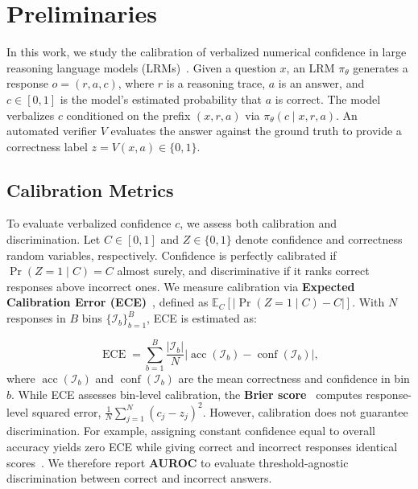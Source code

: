 \documentclass{article} %
\begin{document}
\section{Preliminaries}
In this work, we study the calibration of verbalized numerical confidence in large reasoning language models (LRMs)~\citep{xiong2024can,damani2026beyond}.
Given a question $x$, an LRM $\pi_\theta$ generates a response $o = (r, a, c)$, where $r$ is a reasoning trace, $a$ is an answer, and $c \in [0, 1]$ is the model's estimated probability that $a$ is correct.
The model verbalizes $c$ conditioned on the prefix $(x, r, a)$ via $\pi_\theta(c \mid x, r, a)$.
An automated verifier $V$ evaluates the answer against the ground truth to provide a correctness label $z = V(x, a) \in \{0, 1\}$.





\subsection{Calibration Metrics}

To evaluate verbalized confidence $c$, we assess both calibration and discrimination.
Let $C\in[0,1]$ and $Z\in\{0,1\}$ denote confidence and correctness random variables, respectively.
Confidence is perfectly calibrated if $\Pr(Z=1\mid C)=C$ almost surely, and discriminative if it ranks correct responses above incorrect ones.
We measure calibration via \textbf{Expected Calibration Error (ECE)}~\citep{guo2017calibration}, defined as $\mathbb E_C[|\Pr(Z=1\mid C)-C|]$.
With $N$ responses in $B$ bins $\{\mathcal I_b\}_{b=1}^{B}$, ECE is estimated as:


\begin{equation}
    \operatorname{ECE}
    =\sum_{b=1}^{B}\frac{|\mathcal I_b|}{N}
    \left|\operatorname{acc}(\mathcal I_b)-
    \operatorname{conf}(\mathcal I_b)\right|,
\end{equation}
where $\operatorname{acc}(\mathcal I_b)$ and $\operatorname{conf}(\mathcal I_b)$ are the mean correctness and confidence in bin $b$.
While ECE assesses bin-level calibration, the \textbf{Brier score}~\citep{brier1950verification} computes response-level squared error, 
$\frac{1}{N}\sum_{j=1}^{N}(c_j-z_j)^2$.
However, calibration does not guarantee discrimination. For example,
assigning constant confidence equal to overall accuracy yields zero ECE while giving correct and incorrect responses
identical scores~\citep{eusebi2026reading}. 
We therefore report \textbf{AUROC} to evaluate threshold-agnostic discrimination between correct and incorrect answers.
\end{document}
